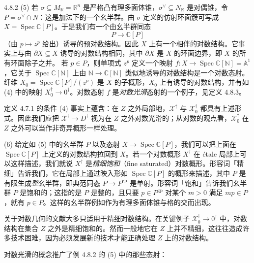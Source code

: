 \begin{example}{4.8.2}
(5) 若 $\sigma\subseteq M_{\mathbb{R}}=\mathbb{R}^n$ 是严格凸有理多面体锥，$\sigma^\vee\subseteq N_{\mathbb{R}}$ 是对偶锥，令 $P=\sigma^\vee\cap N$：这是加法下的一个幺半群。由 $\sigma$ 定义的仿射环面簇可写成 $X=\operatorname{Spec}\mathbb{C}[P]$。于是我们有一个由幺半群同态
\[
P\to\mathbb{C}[P]
\]
（由 $p\mapsto z^p$ 给出）诱导的预对数结构。因此 $X$ 上有一个相伴的对数结构。它事实上与由 $\partial X\subseteq X$ 诱导的对数结构相同，其中 $\partial X$ 是 $X$ 的环面边界，即 $X$ 的所有环面除子之并。
若 $p\in P$，则单项式 $z^p$ 定义一个映射 $f:X\to\operatorname{Spec}\mathbb{C}[\mathbb{N}]=\mathbb{A}^1$，它关于 $\operatorname{Spec}\mathbb{C}[\mathbb{N}]$ 上由 $\mathbb{N}\to\mathbb{C}[\mathbb{N}]$ 类似地诱导的对数结构是一个对数态射。纤维 $X_0=\operatorname{Spec}\mathbb{C}[P]/(z^p)$ 是 $X$ 的子概形，$X_0$ 上有诱导的对数结构，并有如 (4) 中的映射 $X_0^\dagger\to 0^\dagger$。对数态射 $f$ 是\emph{对数光滑}态射的一个例子，见定义 4.8.3。

定义 4.7.1 的条件 (4) 事实上蕴含：在 $Z$ 之外局部地，$\mathcal{X}^\dagger$ 与 $\mathcal{X}_0^\dagger$ 都具有上述形式。因此我们应把 $\mathcal{X}^\dagger\to D^\dagger$ 视为在 $Z$ 之外对数光滑的；从对数的观点看，$\mathcal{X}_0^\dagger$ 在 $Z$ 之外可以当作非奇异概形一样处理。

(6) 给定如 (5) 中的幺半群 $P$ 以及态射 $X\to\operatorname{Spec}\mathbb{C}[P]$，我们可以把上面在 $\operatorname{Spec}\mathbb{C}[P]$ 上定义的对数结构拉回到 $X$。若一个对数概形 $X^\dagger$ 在 étale 局部上可以这样描述，我们就说 $X^\dagger$ 是\emph{精细饱和}（fine saturated）对数概形。形容词「精细」告诉我们，它在局部上通过映入形如 $\operatorname{Spec}\mathbb{C}[P]$ 的概形来描述，其中 $P$ 是有限生成\emph{整}幺半群，即典范同态 $P\to P^{\mathrm{gp}}$ 是单射。形容词「饱和」告诉我们幺半群 $P$ 是饱和的；这指的是 $P$ 是整的，且只要 $p\in P^{\mathrm{gp}}$ 对某个 $m>0$ 满足 $mp\in P$，就有 $p\in P$。这样的幺半群例如作为有理多面体锥与格的交而出现。

关于对数几何的文献大多只适用于精细对数结构。在关键例子 $\mathcal{X}_0^\dagger\to 0^\dagger$ 中，对数结构在集合 $Z$ 之外是精细饱和的。然而一般地它在 $Z$ 上并不精细，这往往造成许多技术困难，因为必须发展新的技术才能正确处理 $Z$ 上的对数结构。\proofend
\end{example}

对数光滑的概念推广了例 4.8.2 的 (5) 中的那些态射：

